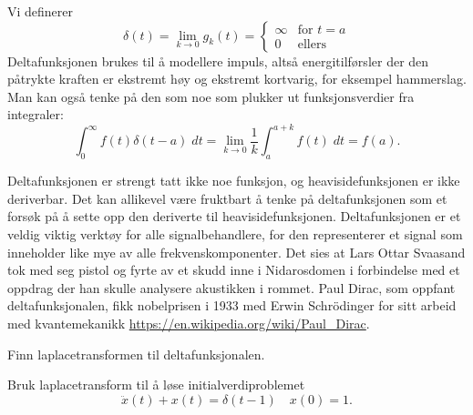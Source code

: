 \documentclass[a4paper,norsk,11pt]{interaktiv}
\begin{document}
Vi definerer
\begin{equation*}
\delta(t)=\lim_{k \to 0} g_k(t)=\begin{cases}
      \infty  & \text{for } t = a  \\
      0 & \text{ellers} 
    \end{cases} 
\end{equation*}
Deltafunksjonen brukes til å modellere impuls, 
altså energitilførsler der den påtrykte kraften er ekstremt høy
og ekstremt kortvarig, for eksempel hammerslag. 
Man kan også tenke på den som noe som plukker ut funksjonsverdier fra integraler:
\begin{equation*}
\int_0^{\infty} f(t)\delta(t-a)\; dt=\lim_{k \to 0}\frac{1}{k}\int_a^{a+k} f(t)\; dt=f(a).
\end{equation*}



Deltafunksjonen er strengt tatt ikke noe funksjon,
og heavisidefunksjonen er ikke deriverbar. 
Det kan allikevel være fruktbart å tenke på deltafunksjonen
som et forsøk på å sette opp den deriverte til heavisidefunksjonen.
Deltafunksjonen er et veldig viktig verktøy for alle signalbehandlere, 
for den representerer et signal som inneholder like mye av alle frekvenskomponenter. 
Det sies at Lars Ottar Svaasand tok med seg pistol og fyrte av et skudd inne i Nidarosdomen i forbindelse med et oppdrag der han skulle analysere akustikken i rommet. 
Paul Dirac, som oppfant deltafunksjonalen, fikk nobelprisen i 1933 med Erwin Schrödinger for sitt arbeid med kvantemekanikk \url{https://en.wikipedia.org/wiki/Paul_Dirac}.


\begin{oppgave}{7}
Finn laplacetransformen til deltafunksjonalen.
\end{oppgave}


\begin{oppgave}{8}
Bruk laplacetransform til å løse initialverdiproblemet
\[
\ddot{x}(t)+x(t)=\delta(t-1) \quad x(0)=1.
\]
\end{oppgave}
\end{document}
